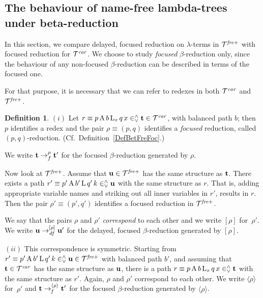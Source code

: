 \documentclass{article}
\theoremstyle{plain}
\theoremstyle{definition}
\newtheorem{Def}[The]{Definition}
\begin{document}
{%



\subsection{The behaviour of name-free lambda-trees under beta-reduction}

In this section, we compare delayed, focused reduction on $\lambda$-terms in ${\cal T}^{\it fre+}$ with focused reduction for ${\cal T}^{\it car}$.  We choose to study {\it focused\/} $\beta$-reduction only, since the behaviour of any non-focused $\beta$-reduction can be described in terms of the focused one. 



For that purpose, it is necessary that we can refer to redexes in both ${\cal T}^{\it car}$ and ${\cal T}^{\it fre+}$.

\begin{Def} $(i)$ Let $r \equiv p \, {\rm A} \, b \, {\rm L}_x \, q \, x\in^\wedge_\vee {\bf t} \in {\cal T}^{\it car}$, with balanced path $b$; then
$p$ identifies a redex and the pair $\rho \equiv (p,q)$ identifies a {\em focused\/} reduction, called $(p,q)$-reduction. (Cf.\ Definition~\ref{DefBetFreFoc}.)

We write ${\bf t} \rightarrow_f^\rho {\bf t}'$ for the focused $\beta$-reduction generated by $\rho$.


Now look at ${\cal T}^{\it fre+}$. Assume that ${\bf u} \in {\cal T}^{\it fre+}$ has the same structure as ${\bf t}$. There exists a path $r' \equiv p' \, {\rm A} \, b' \, {\rm L} \, q' \, k \in^\wedge_\vee {\bf u}$ with the same structure as $r$. That is, adding appropriate variable names and striking out all inner variables in $r'$, results in $r$.  Then the pair $\rho' \equiv (p',q')$ identifies a focused reduction in ${\cal T}^{\it fre+}$.



We say that the pairs $\rho$ and $\rho'$ {\em correspond\/} to each other and we write $[\rho]$ for~$\rho'$. We write ${\bf u} \rightarrow_{\it df}^{[\rho]} {\bf u}'$ for the delayed, focused $\beta$-reduction generated by $[\rho]$.

$(ii)$ This correspondence is symmetric. Starting from $r' \equiv  p' \, {\rm A} \, b' \, {\rm L} \, q' \, k \in^\wedge_\vee {\bf u} \in {\cal T}^{\it fre+}$ with balanced path $b'$, and assuming that ${\bf t} \in {\cal T}^{\it car}$ has the same structure as ${\bf u}$, there is a path $r \equiv p \, {\rm A} \, b \, {{\rm L}}_x \, q \, x \in^\wedge_\vee {\bf t}$ with the same structure as $r'$. Again, $\rho$ and $\rho'$ correspond to each other. We write $\langle \rho \rangle$ for~$\rho'$ and ${\bf t} \rightarrow_{\it f}^{\langle \rho \rangle} {\bf t}'$ for the focused $\beta$-reduction generated by $\langle \rho \rangle$.
\end{Def}

}
\end{document}
